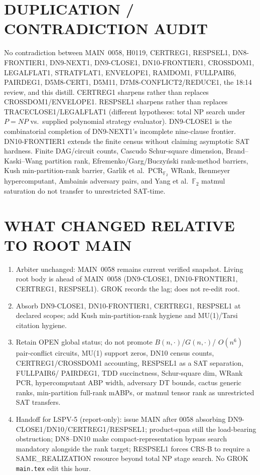 \documentclass[11pt]{article}
\begin{document}
\section*{DUPLICATION / CONTRADICTION AUDIT}
No contradiction between MAIN~0058, H0119, CERTREG1, RESPSEL1, DN8-FRONTIER1,
DN9-NEXT1, DN9-CLOSE1, DN10-FRONTIER1, CROSSDOM1, LEGALFLAT1, STRATFLAT1,
ENVELOPE1, RAMDOM1, FULLPAIR6, PAIRDEG1, D5M8-CERT1, D5M11,
D7M8-CONFLICT2/REDUCE1, the 18:14 review, and this distill. CERTREG1 sharpens
rather than replaces CROSSDOM1/ENVELOPE1. RESPSEL1 sharpens rather than
replaces TRACECLOSE1/LEGALFLAT1 (different hypotheses: total NP search under
$P=NP$ vs.\ supplied polynomial strategy evaluator). DN9-CLOSE1 is the
combinatorial completion of DN9-NEXT1's incomplete nine-clause frontier.
DN10-FRONTIER1 extends the finite census without claiming asymptotic SAT
hardness. Finite DAG/circuit counts, Cascudo Schur-square dimension,
Brand--Kaski--Wang partition rank, Efremenko/Garg/Buczy\'nski rank-method
barriers, Kush min-partition-rank barrier, Garlik et al.\ PCR$_{\mathbb F_2}$
WRank, Ikenmeyer hypercomputant, Ambainis adversary pairs, and Yang et al.\
$\mathbb F_2$ matmul saturation do not transfer to unrestricted SAT-time.

\section*{WHAT CHANGED RELATIVE TO ROOT MAIN}
\begin{enumerate}
\item Arbiter unchanged: MAIN~0058 remains current verified snapshot. Living
root body is ahead of MAIN~0058 (DN9-CLOSE1, DN10-FRONTIER1, CERTREG1,
RESPSEL1). GROK records the lag; does not re-edit root.
\item Absorb DN9-CLOSE1, DN10-FRONTIER1, CERTREG1, RESPSEL1 at declared scopes;
add Kush min-partition-rank hygiene and MU(1)/Tarsi citation hygiene.
\item Retain OPEN global status; do not promote $B(n,\cdot)$/$G(n,\cdot)$/
$O(n^6)$ pair-conflict circuits, MU(1) support zeros, DN10 census counts,
CERTREG1/CROSSDOM1 accounting, RESPSEL1 as a SAT separation, FULLPAIR6/
PAIRDEG1, TDD succinctness, Schur-square dim, WRank PCR, hypercomputant ABP
width, adversary DT bounds, cactus generic ranks, min-partition full-rank
mABPs, or matmul tensor rank as unrestricted SAT transfers.
\item Handoff for LSPV-5 (report-only): issue MAIN after 0058 absorbing
DN9-CLOSE1/DN10/CERTREG1/RESPSEL1; product-span still the load-bearing
obstruction; DN8--DN10 make compact-representation bypass search mandatory
alongside the rank target; RESPSEL1 forces CRS-B to require a
SAME\_REALIZATION resource beyond total NP stage search. No GROK
\texttt{main.tex} edit this hour.
\end{enumerate}
\end{document}
